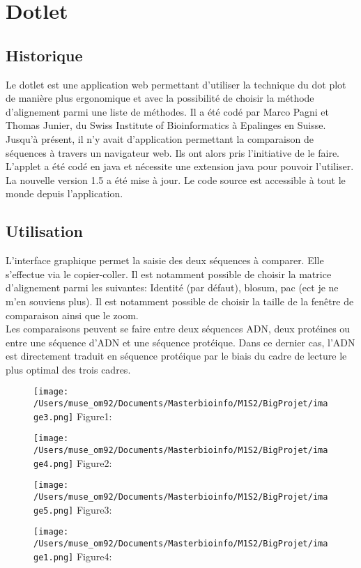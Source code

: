\documentclass{report}
\begin{document}


\chapter{Dotlet}

\section{Historique}

Le dotlet est une application web permettant d'utiliser la technique du dot plot de manière plus ergonomique et avec la possibilité de choisir la méthode d'alignement parmi une liste de méthodes. 
Il a été codé par Marco Pagni et Thomas Junier, du Swiss Institute of Bioinformatics à Epalinges en Suisse. Jusqu'à présent, il n'y avait d'application permettant la comparaison de séquences à travers un navigateur web. Ils ont alors pris l'initiative de le faire.\\
L'applet a été codé en java et nécessite une extension java pour pouvoir l'utiliser. La nouvelle version 1.5 a été mise à jour. Le code source est accessible à tout le monde depuis l'application.\\


\section{Utilisation}

L'interface graphique permet la saisie des deux séquences à comparer. Elle s'effectue via le copier-coller. Il est notamment possible de choisir la matrice d'alignement parmi les suivantes: Identité (par défaut), blosum, pac (ect je ne m'en souviens plus). Il est notamment possible de choisir la taille de la fenêtre de comparaison ainsi que le zoom. \\
Les comparaisons peuvent se faire entre deux séquences ADN, deux protéines ou entre une séquence d'ADN et une séquence protéique. Dans ce dernier cas, l'ADN est directement traduit en séquence protéique par le biais du cadre de lecture le plus optimal des trois cadres.\\

\begin{figure}[!h]
\centering
\texttt{[image: /Users/muse\_om92/Documents/Masterbioinfo/M1S2/BigProjet/image3.png]}
Figure1: 
\end{figure}
\begin{figure}[!h]
\centering
\texttt{[image: /Users/muse\_om92/Documents/Masterbioinfo/M1S2/BigProjet/image4.png]}
Figure2:
\end{figure}
\begin{figure}[!h]
\centering
\texttt{[image: /Users/muse\_om92/Documents/Masterbioinfo/M1S2/BigProjet/image5.png]}
Figure3:
\end{figure}
\begin{figure}[!h]
\centering
\texttt{[image: /Users/muse\_om92/Documents/Masterbioinfo/M1S2/BigProjet/image1.png]}
Figure4:
\end{figure}
\end{document}
